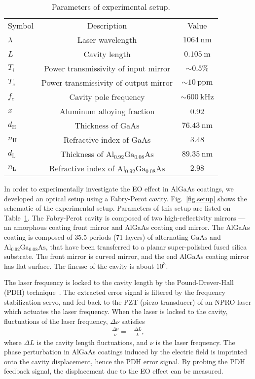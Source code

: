 \documentclass[%
 reprint,
 superscriptaddress,
 amsmath,amssymb,
 aps,
]{revtex4-2}
\newcommand{\unit}[1]{\ \mathrm{#1}}
\begin{document}
\begin{table}[htbp]
\caption{\label{tab.param}%
Parameters of experimental setup.}
\begin{ruledtabular}
\begin{tabular}{lcc}
Symbol & Description & Value \\
\colrule
$\lambda$ & Laser wavelength & $1064\unit{nm}$ \\
$L$ & Cavity length & $0.105\unit{m}$ \\
$T_i$ & Power transmissivity of input mirror & $\sim0.5\%$ \\
$T_e$ & Power transmissivity of output mirror & $\sim10\unit{ppm}$ \\
$f_c$ & Cavity pole frequency & $\sim600\unit{kHz}$ \\
$x$ & Aluminum alloying fraction & 0.92 \\
$d_{\mathrm{H}}$ & Thickness of $\mathrm{GaAs}$ & $76.43\unit{nm}$ \\
$n_{\mathrm{H}}$ & Refractive index of $\mathrm{GaAs}$ & $3.48$ \\
$d_{\mathrm{L}}$ & Thickness of $\mathrm{Al_{0.92}Ga_{0.08}As}$ & $89.35\unit{nm}$ \\
$n_{\mathrm{L}}$ & Refractive index of $\mathrm{Al_{0.92}Ga_{0.08}As}$ & $2.98$ \\
\end{tabular}
\end{ruledtabular}
\end{table}

In order to experimentally investigate the EO effect in AlGaAs coatings, we developed an optical setup using a Fabry-Perot cavity.
Fig.~\ref{fig.setup} shows the schematic of the experimental setup.
Parameters of this setup are listed on Table~\ref{tab.param}.
The Fabry-Perot cavity is composed of two high-reflectivity mirrors --- an amorphous coating front mirror and AlGaAs coating end mirror.
The AlGaAs coating is composed of 35.5 periods (71 layers) of alternating $\mathrm{GaAs}$ and $\mathrm{Al_{0.92}Ga_{0.08}As}$, that have been transferred to a planar super-polished fused silica substrate.
The front mirror is curved mirror, and the end AlGaAs coating mirror has flat surface.
The finesse of the cavity is about $10^3$.

The laser frequency is locked to the cavity length by the Pound-Drever-Hall (PDH) technique~\cite{PDH}.
The extracted error signal is filtered by the frequency stabilization servo, and fed back to the PZT (piezo transducer) of an NPRO laser which actuates the laser frequency.
When the laser is locked to the cavity, fluctuations of the laser frequency, $\Delta\nu$ satisfies
\begin{align}
    \frac{\Delta \nu}{\nu} = -\frac{\Delta L}{L},
    \label{eq.cavity_fluctuation}
\end{align}
where $\Delta L$ is the cavity length fluctuations, and $\nu$ is the laser frequency.
The phase perturbation in AlGaAs coatings induced by the electric field is imprinted onto the cavity displacement, hence the PDH error signal.
By probing the PDH feedback signal, the displacement due to the EO effect can be measured.
\end{document}
